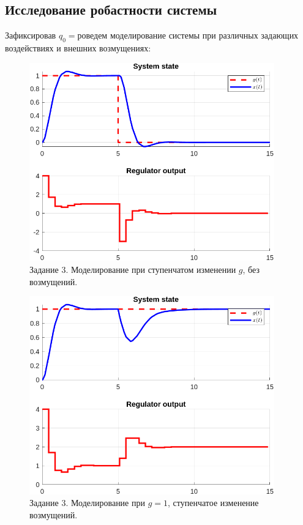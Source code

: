 \documentclass[a4paper, 14pt]{extarticle}
\theoremstyle{definition}
\theoremstyle{plain}
\theoremstyle{remark}
\begin{document}
\subsection{Исследование робастности системы}
Зафиксировав $q_0=$роведем моделирование системы при различных задающих воздействиях и внешних возмущениях:
\begin{figure}
    [H]
    \centering
    \includegraphics[width=300pt]{images/task3__step_input_state.png}
    \caption{Задание 3. Моделирование при ступенчатом изменении $g$, без возмущений.}
    \label{fig:task3__step_input_state}
\end{figure}
\begin{figure}
    [H]
    \centering
    \includegraphics[width=300pt]{images/task3__step_perturb_state.png}
    \caption{Задание 3. Моделирование при $g=1$, ступенчатое изменение возмущений.}
    \label{fig:task3__step_perturb_state}
\end{figure}
\end{document}

